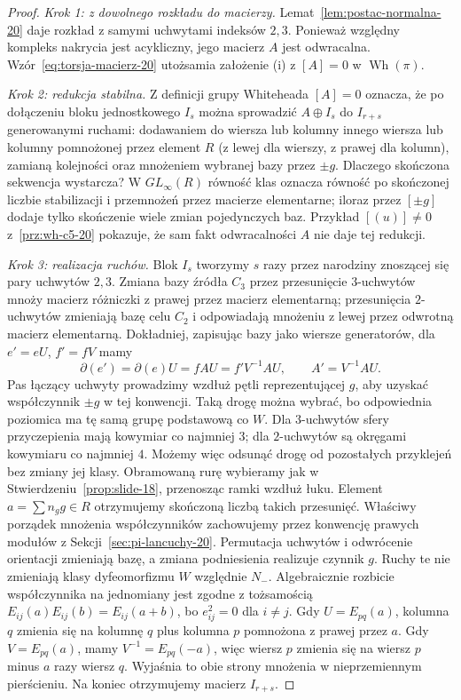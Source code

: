 \begin{proof}
\emph{Krok 1: z dowolnego rozkładu do macierzy.}
Lemat~\ref{lem:postac-normalna-20} daje rozkład
z samymi uchwytami indeksów $2,3$.
Ponieważ względny kompleks nakrycia jest
acykliczny, jego macierz $A$ jest odwracalna.
Wzór~\eqref{eq:torsja-macierz-20} utożsamia
założenie (i) z $[A]=0$ w $\operatorname{Wh}(\pi)$.

\emph{Krok 2: redukcja stabilna.}
Z definicji grupy Whiteheada $[A]=0$ oznacza,
że po dołączeniu bloku jednostkowego $I_s$
można sprowadzić $A\oplus I_s$ do $I_{r+s}$
generowanymi ruchami: dodawaniem do wiersza
lub kolumny innego wiersza lub kolumny
pomnożonej przez element $R$ (z lewej dla wierszy,
z prawej dla kolumn), zamianą kolejności
oraz mnożeniem wybranej bazy przez $\pm g$.
Dlaczego skończona sekwencja wystarcza?
W $GL_\infty(R)$ równość klas oznacza równość
po skończonej liczbie stabilizacji i przemnożeń
przez macierze elementarne; iloraz przez
$[\pm g]$ dodaje tylko skończenie wiele zmian
pojedynczych baz. Przykład
$[(u)]\ne0$ z~\ref{prz:wh-c5-20} pokazuje,
że sam fakt odwracalności $A$ nie daje tej redukcji.

\emph{Krok 3: realizacja ruchów.}
Blok $I_s$ tworzymy $s$ razy przez narodziny
znoszącej się pary uchwytów $2,3$. Zmiana bazy
źródła $C_3$ przez przesunięcie $3$-uchwytów
mnoży macierz różniczki z prawej przez macierz
elementarną; przesunięcia $2$-uchwytów zmieniają
bazę celu $C_2$ i odpowiadają mnożeniu z lewej
przez odwrotną macierz elementarną. Dokładniej, zapisując
bazy jako wiersze generatorów, dla $e'=eU$, $f'=fV$ mamy
\[
 \partial(e')=\partial(e)U=fAU=f'V^{-1}AU,
 \qquad A'=V^{-1}AU.
\]
Pas łączący
uchwyty prowadzimy wzdłuż pętli reprezentującej
$g$, aby uzyskać współczynnik $\pm g$ w tej konwencji.
Taką drogę można wybrać, bo odpowiednia poziomica ma tę
samą grupę podstawową co $W$. Dla $3$-uchwytów sfery
przyczepienia mają kowymiar co najmniej $3$;
dla $2$-uchwytów są okręgami kowymiaru co najmniej $4$.
Możemy więc odsunąć drogę od pozostałych przyklejeń bez
zmiany jej klasy. Obramowaną rurę wybieramy jak w
Stwierdzeniu~\ref{prop:slide-18}, przenosząc ramki wzdłuż łuku.
Element
$a=\sum n_g g\in R$ otrzymujemy skończoną
liczbą takich przesunięć. Właściwy porządek
mnożenia współczynników zachowujemy przez
konwencję prawych modułów z
Sekcji~\ref{sec:pi-lancuchy-20}. Permutacja
uchwytów i odwrócenie orientacji zmieniają
bazę, a zmiana podniesienia realizuje czynnik
$g$. Ruchy te nie zmieniają klasy dyfeomorfizmu
$W$ względnie $N_-$.
Algebraicznie rozbicie współczynnika na jednomiany jest zgodne
z tożsamością $E_{ij}(a)E_{ij}(b)=E_{ij}(a+b)$,
bo $e_{ij}^2=0$ dla $i\ne j$. Gdy $U=E_{pq}(a)$,
kolumna $q$ zmienia się na kolumnę $q$ plus kolumna $p$
pomnożona z prawej przez $a$.
Gdy $V=E_{pq}(a)$, mamy $V^{-1}=E_{pq}(-a)$,
więc wiersz $p$ zmienia się na wiersz $p$ minus $a$
razy wiersz $q$. Wyjaśnia to obie strony mnożenia
w nieprzemiennym pierścieniu.
Na koniec otrzymujemy macierz $I_{r+s}$.


\end{proof}
